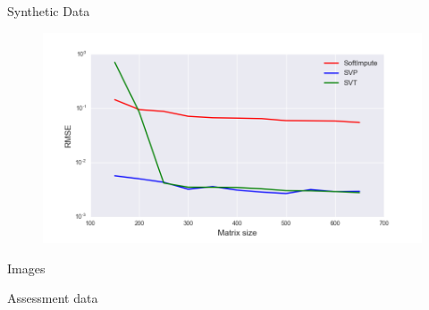 \documentclass{beamer}
\begin{document}
\begin{frame}{Synthetic Data}
	\begin{figure}[h]
		\centering
		\includegraphics[width=1\linewidth]{./../results/synthetic/exper_3/synthetic_size_rmse.png}
		\label{heat_map}
	\end{figure}
\end{frame}
\begin{frame}{Images}
	
\end{frame}
\begin{frame}{Assessment data}
	
\end{frame}
\end{document}
